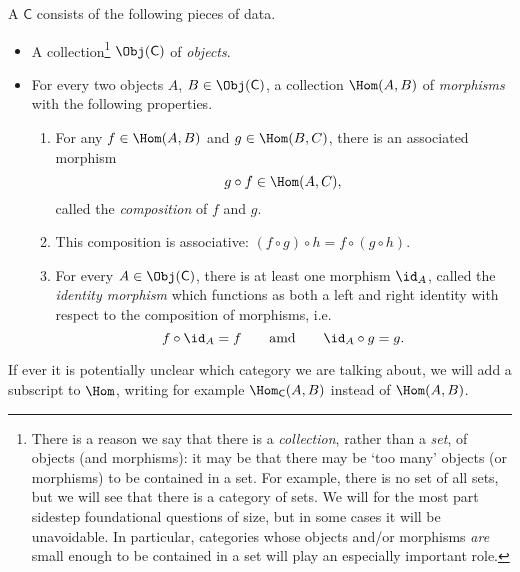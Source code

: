 \documentclass[notes.tex]{subfiles}
\begin{document}
\begin{definition}[category]
  \label{def:category}
  A  $\mathsf{C}$ consists of the following pieces of data.
  \begin{itemize}
    \item A collection\footnote{There is a reason we say that there is a \emph{collection}, rather than a \emph{set}, of objects (and morphisms): it may be that there may be `too many' objects (or morphisms) to be contained in a set. For example, there is no set of all sets, but we will see that there is a category of sets. We will for the most part sidestep foundational questions of size, but in some cases it will be unavoidable. In particular, categories whose objects and/or morphisms \emph{are\/} small enough to be contained in a set will play an especially important role.} $\Obj(\mathsf{C})$ of \emph{objects}.
    \item For every two objects $A$, $B \in \Obj(\mathsf{C})$, a collection $\Hom(A,B)$ of \emph{morphisms\/} with the following properties.
      \begin{enumerate}
        \item\label{item:compositionofmorphisms} For any $f \in \Hom(A,B)$ and $g \in \Hom(B,C)$, there is an associated morphism
          \begin{equation*}
            g \circ f \in \Hom(A,C),
          \end{equation*} called the \emph{composition\/} of $f$ and $g$.

        \item This composition is associative: $(f \circ g) \circ h = f \circ (g \circ h)$.

        \item\label{item:existenceofidentitymorphism} For every $A \in \Obj(\mathsf{C})$, there is at least one morphism $\id_{A}$, called the \emph{identity morphism\/} which functions as both a left and right identity with respect to the composition of morphisms, i.e.\
          \begin{equation*}
            f \circ \id_{A} = f\qquad\text{amd}\qquad \id_{A} \circ g = g.
          \end{equation*}
      \end{enumerate}
  \end{itemize}

  If ever it is potentially unclear which category we are talking about, we will add a subscript to $\Hom$, writing for example $\Hom_{\mathsf{C}}(A,B)$ instead of $\Hom(A,B)$.
\end{definition}
\end{document}
